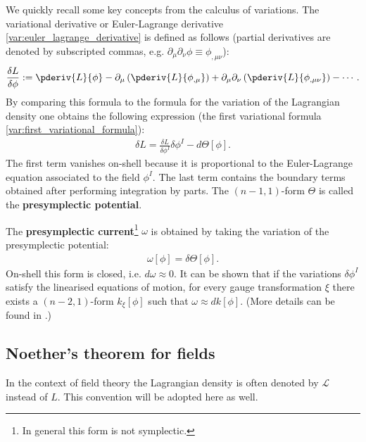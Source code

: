    We quickly recall some key concepts from the calculus of variations. The variational derivative or Euler-Lagrange derivative \ref{var:euler_lagrange_derivative} is defined as follows (partial derivatives are denoted by subscripted commas, e.g. $\partial_\mu\partial_\nu\phi\equiv\phi_{,\mu\nu}$):
    \begin{gather}
        \frac{\delta L}{\delta \phi} := \pderiv{L}{\phi} - \partial_\mu\left(\pderiv{L}{\phi_{,\mu}}\right) + \partial_\mu\partial_\nu\left(\pderiv{L}{\phi_{,\mu\nu}}\right) -\cdots.
    \end{gather}
    By comparing this formula to the formula for the variation of the Lagrangian density one obtains the following expression (the first variational formula \ref{var:first_variational_formula}):
    \begin{gather}
        \delta L = \frac{\delta L}{\delta \phi^I}\delta\phi^I - d\Theta[\phi].
    \end{gather}
    The first term vanishes on-shell because it is proportional to the Euler-Lagrange equation associated to the field $\phi^I$. The last term contains the boundary terms obtained after performing integration by parts. The $(n-1,1)$-form $\Theta$ is called the \textbf{presymplectic potential}.

    The \textbf{presymplectic current}\footnote{In general this form is not symplectic.} $\omega$ is obtained by taking the variation of the presymplectic potential:
    \begin{gather}
        \omega[\phi] = \delta\Theta[\phi].
    \end{gather}
    On-shell this form is closed, i.e. $d\omega\approx0$. It can be shown that if the variations $\delta\phi^I$ satisfy the linearised equations of motion, for every gauge transformation $\xi$ there exists a $(n-2, 1)$-form $k_\xi[\phi]$ such that $\omega\approx dk[\phi]$. (More details can be found in \cite{compere}.)

\subsection{Noether's theorem for fields}

    In the context of field theory the Lagrangian density is often denoted by $\mathcal{L}$ instead of $L$. This convention will be adopted here as well.

